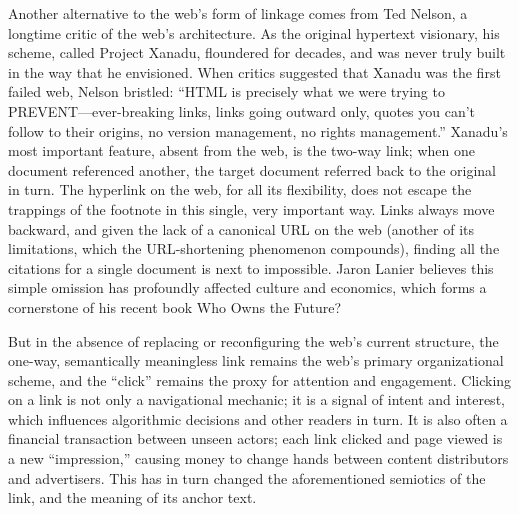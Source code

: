 Another alternative to the web's form of linkage comes from Ted Nelson, a longtime critic of the web's architecture. As the original hypertext visionary, his scheme, called Project Xanadu, floundered for decades, and was never truly built in the way that he envisioned. When critics suggested that Xanadu was the first failed web, Nelson bristled: ``HTML is precisely what we were trying to PREVENT—ever-breaking links, links going outward only, quotes you can't follow to their origins, no version management, no rights management.''  Xanadu's most important feature, absent from the web, is the two-way link; when one document referenced another, the target document referred back to the original in turn. The hyperlink on the web, for all its flexibility, does not escape the trappings of the footnote in this single, very important way. Links always move backward, and given the lack of a canonical URL on the web (another of its limitations, which the URL-shortening phenomenon compounds), finding all the citations for a single document is next to impossible. Jaron Lanier believes this simple omission has profoundly affected culture and economics, which forms a cornerstone of his recent book Who Owns the Future? 

But in the absence of replacing or reconfiguring the web's current structure, the one-way, semantically meaningless link remains the web's primary organizational scheme, and the ``click'' remains the proxy for attention and engagement. Clicking on a link is not only a navigational mechanic; it is a signal of intent and interest, which influences algorithmic decisions and other readers in turn. It is also often a financial transaction between unseen actors; each link clicked and page viewed is a new ``impression,'' causing money to change hands between content distributors and advertisers. This has in turn changed the aforementioned semiotics of the link, and the meaning of its anchor text.

